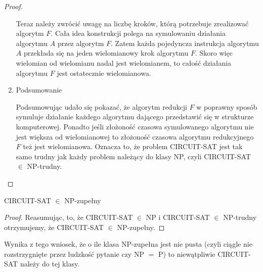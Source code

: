 \begin{proof}
\begin{enumerate}
Teraz należy zwrócić uwagę na liczbę kroków, którą potrzebuje zrealizować algorytm $F$. Cała idea konstrukcji polega na symulowaniu działania algorytmu $A$ przez algorytm $F$. Zatem każda pojedyncza instrukcja algorytmu $A$ przekłada się na jeden wielomianowy krok algorytmu $F$. Skoro więc wielomian od wielomianu nadal jest wielomianem, to całość działania algorytmu $F$ jest ostatecznie wielomianowa.
	
\item Podsumowanie

Podsumowując udało się pokazać, że algorytm redukcji $F$ w poprawny sposób symuluje działanie każdego algorytmu dającego przedstawić się w strukturze komputerowej. Ponadto jeśli złożoność czasowa symulowanego algorytmu nie jest większa od wielomianowej to złożoność czasowa algorytmu redukcyjnego $F$ też jest wielomianowa. Oznacza to, że problem CIRCUIT-SAT jest tak samo trudny jak każdy problem należący do klasy NP, czyli CIRCUIT-SAT $\in$ NP-trudny.


\end{enumerate}
\end{proof}

\begin{twr}
	CIRCUIT-SAT $\in$ NP-zupełny
\end{twr}

\begin{proof}
Reasumując, to, że CIRCUIT-SAT $\in$ NP i CIRCUIT-SAT $\in$ NP-trudny otrzymujemy, że CIRCUIT-SAT $\in$ NP-zupełny.
\end{proof}


Wynika z tego wniosek, że o ile klasa NP-zupełna jest nie pusta (czyli ciągle nie rozstrzygnięte przez ludzkość pytanie czy NP $=$ P) to niewątpliwie CIRCUIT-SAT należy do tej klasy.
